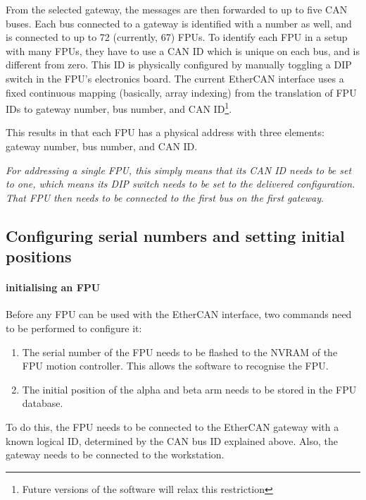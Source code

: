 \documentclass[11pt,a4paper]{scrartcl}
\begin{document}
From the selected gateway, the messages are then forwarded to up to
five CAN buses. Each bus connected to a gateway is identified with a
number as well, and is connected to up to 72 (currently, 67) FPUs.
 To identify each FPU in a setup with many FPUs,
they have to use a CAN ID which is unique on each bus, and is
different from zero. This ID is physically configured by manually
toggling a DIP switch in the FPU's electronics board. The current
EtherCAN interface uses a fixed continuous mapping (basically, array indexing)
from the translation of FPU IDs to gateway number, bus number, and CAN
ID\footnote{Future versions of the software will relax this
  restriction}.

This results in that each FPU has a physical address with three
elements: gateway number, bus number, and CAN ID.

\emph{For addressing a single FPU, this simply means that its CAN ID
  needs to be set to one, which means its DIP switch needs to be set
  to the delivered configuration. That FPU then needs to be connected
  to the first bus on the first gateway}.


\subsection{Configuring serial numbers and setting initial positions}
\label{sec:setinitialposition}

\paragraph{initialising an FPU}

Before any FPU can be used with the EtherCAN interface, two commands
need to be performed to configure it:

\begin{enumerate}
\item The serial number of the FPU needs to be flashed to the
  NVRAM of the FPU motion controller. This allows the software
  to recognise the FPU.
\item The initial position of the alpha and beta arm needs to
  be stored in the FPU database.
\end{enumerate}

To do this, the FPU needs to be connected to the EtherCAN gateway with
a known logical ID, determined by the CAN bus ID explained
above. Also, the gateway needs to be connected to the workstation.
\end{document}
